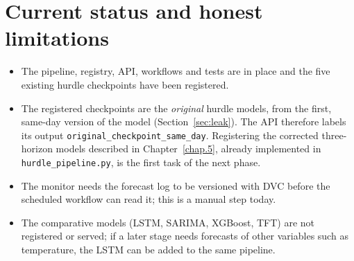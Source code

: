 \section{Current status and honest limitations}
\begin{itemize}
	\item The pipeline, registry, API, workflows and tests are in place and the five existing hurdle checkpoints have been registered.
	\item The registered checkpoints are the \emph{original} hurdle models, from the first, same-day version of the model (Section~\ref{sec:leak}). The API therefore labels its output \texttt{original\_checkpoint\_same\_day}. Registering the corrected three-horizon models described in Chapter~\ref{chap.5}, already implemented in \texttt{hurdle\_pipeline.py}, is the first task of the next phase.
	\item The monitor needs the forecast log to be versioned with DVC before the scheduled workflow can read it; this is a manual step today.
	\item The comparative models (LSTM, SARIMA, XGBoost, TFT) are not registered or served; if a later stage needs forecasts of other variables such as temperature, the LSTM can be added to the same pipeline.
\end{itemize}
